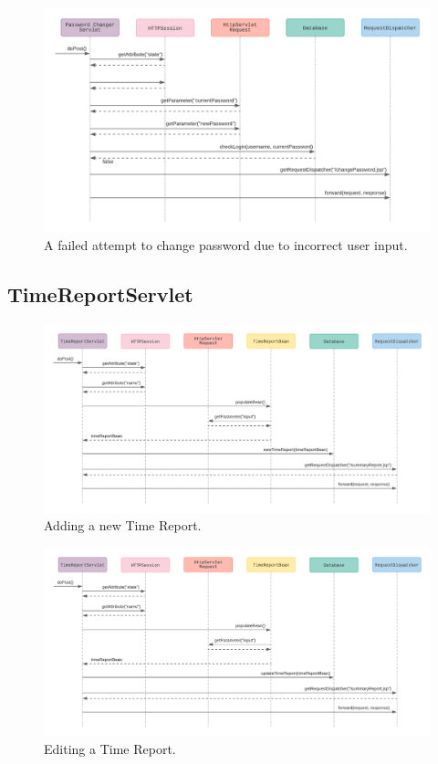 \documentclass{article}
\begin{document}
\begin{figure}[H]
    \centering
    \includegraphics[scale=0.5]{images/changePasswordFalseInput.png}
    \caption{A failed attempt to change password due to incorrect user input.}
    \label{fig:failedPasswordChangeIncorrectInput}
\end{figure}

\pagebreak

\subsection{TimeReportServlet}

\begin{figure}[H]
    \centering
    \includegraphics[scale=0.5]{images/newTimeReport.png}
    \caption{Adding a new Time Report.}
    \label{fig:newTimeReport}
\end{figure}

\begin{figure}[H]
    \centering
    \includegraphics[scale=0.5]{images/editTimeReport.png}
    \caption{Editing a Time Report.}
    \label{fig:editTimeReport}
\end{figure}
\end{document}
